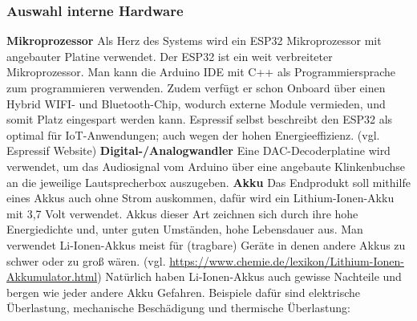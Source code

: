 \documentclass[]{article}
\begin{document}
\subsubsection{Auswahl interne Hardware}
\textbf{Mikroprozessor}\newline
Als Herz des Systems wird ein ESP32 Mikroprozessor mit angebauter Platine verwendet. Der ESP32 ist ein weit verbreiteter Mikroprozessor. Man kann die Arduino IDE mit C++ als Programmiersprache zum programmieren verwenden. Zudem verfügt er schon Onboard über einen Hybrid WIFI- und Bluetooth-Chip, wodurch externe Module vermieden, und somit Platz eingespart werden kann. Espressif selbst beschreibt den ESP32 als optimal für IoT-Anwendungen; auch wegen der hohen Energieeffizienz. (vgl. Espressif Website)
\vspace{4mm}\newline
\textbf{Digital-/Analogwandler}\newline
Eine DAC-Decoderplatine wird verwendet, um das Audiosignal vom Arduino über eine angebaute Klinkenbuchse an die jeweilige Lautsprecherbox auszugeben.
\vspace{4mm}\newline
\textbf{Akku}\newline
Das Endprodukt soll mithilfe eines Akkus auch ohne Strom auskommen, dafür wird ein Lithium-Ionen-Akku mit 3,7 Volt verwendet. Akkus dieser Art zeichnen sich durch ihre hohe Energiedichte und, unter guten Umständen, hohe Lebensdauer aus. Man verwendet Li-Ionen-Akkus meist für (tragbare) Geräte in denen andere Akkus zu schwer oder zu groß wären. (vgl. \url{https://www.chemie.de/lexikon/Lithium-Ionen-Akkumulator.html}) \vspace{4mm}\newline
Natürlich haben Li-Ionen-Akkus auch gewisse Nachteile und bergen wie jeder andere Akku Gefahren. Beispiele dafür sind elektrische Überlastung, mechanische Beschädigung und thermische Überlastung:
\end{document}
